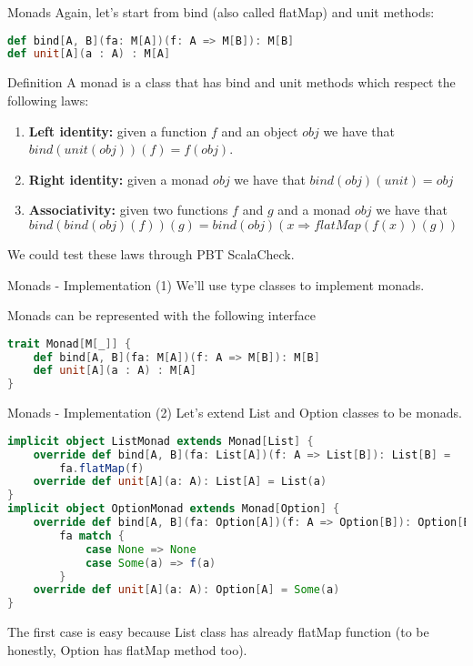 \begin{frame}[fragile]{Monads}
	Again, let's start from bind (also called flatMap) and unit methods:
\begin{lstlisting}[language=scala]
def bind[A, B](fa: M[A])(f: A => M[B]): M[B]
def unit[A](a : A) : M[A]
\end{lstlisting}
	\pause
	\begin{block}{Definition}
		A monad is a class that has bind and unit methods which respect the following laws:
		\begin{enumerate}[<+->]
			\item \textbf{Left identity:}  given a function $f$ and an object $obj$ we have that $bind(unit(obj))(f) = f(obj)$.
			\item \textbf{Right identity:} given a monad $obj$ we have that $bind(obj)(unit) = obj$
			\item \textbf{Associativity:} given two functions $f$ and $g$ and a monad $obj$ we have that 
			$bind(bind(obj)(f))(g) = bind(obj)(x \Rightarrow flatMap(f(x))(g))$
		\end{enumerate}
	\end{block}
	\pause[4]
	We could test these laws through PBT ScalaCheck.
\end{frame}

\begin{frame}[fragile]{Monads - Implementation (1)}	
	We'll use type classes to implement monads.
	
	Monads can be represented with the following interface
\begin{lstlisting}[language=scala]
trait Monad[M[_]] {
	def bind[A, B](fa: M[A])(f: A => M[B]): M[B]
	def unit[A](a : A) : M[A]
}			
\end{lstlisting}
\end{frame}

\begin{frame}[fragile]{Monads - Implementation (2)}	
	Let's extend List and Option classes to be monads.
\begin{lstlisting}[language=scala]
implicit object ListMonad extends Monad[List] {
	override def bind[A, B](fa: List[A])(f: A => List[B]): List[B] =
		fa.flatMap(f)
	override def unit[A](a: A): List[A] = List(a)
}
implicit object OptionMonad extends Monad[Option] {
	override def bind[A, B](fa: Option[A])(f: A => Option[B]): Option[B] =
		fa match {
			case None => None
			case Some(a) => f(a)
		}
	override def unit[A](a: A): Option[A] = Some(a)
}		
\end{lstlisting}		
	The first case is easy because List class has already flatMap function
	(to be honestly, Option has flatMap method too).
\end{frame}

